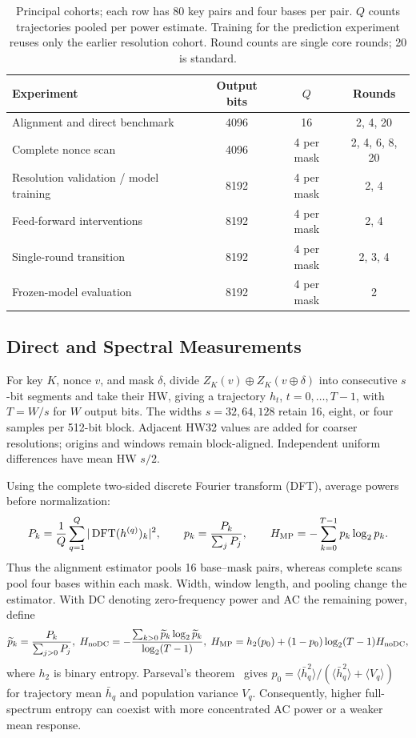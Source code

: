 \documentclass[electronics,article,submit,pdftex,oneauthor]{Definitions/mdpi}
\begin{document}
\begin{table}[t]
\caption{Principal cohorts; each row has 80 key pairs and four bases per pair. $Q$ counts trajectories pooled per power estimate. Training for the prediction experiment reuses only the earlier resolution cohort. Round counts are single core rounds; 20 is standard.\label{tab:cohorts}}
\small\setlength{\tabcolsep}{4pt}
\begin{tabularx}{\textwidth}{Xccc}
\toprule
\textbf{Experiment} & \textbf{Output bits} & \textbf{$Q$} & \textbf{Rounds}\\
\midrule
Alignment and direct benchmark & 4096 & 16 & 2, 4, 20\\
Complete nonce scan & 4096 & 4 per mask & 2, 4, 6, 8, 20\\
Resolution validation / model training & 8192 & 4 per mask & 2, 4\\
Feed-forward interventions & 8192 & 4 per mask & 2, 4\\
Single-round transition & 8192 & 4 per mask & 2, 3, 4\\
Frozen-model evaluation & 8192 & 4 per mask & 2\\
\bottomrule
\end{tabularx}
\end{table}

\subsection{Direct and Spectral Measurements}\label{sec:spectral}

For key $K$, nonce $v$, and mask $\delta$, divide $Z_K(v)\oplus Z_K(v\oplus\delta)$ into consecutive $s$-bit segments and take their HW, giving a trajectory $h_t$, $t=0,\ldots,T-1$, with $T=W/s$ for $W$ output bits. The widths $s=32,64,128$ retain 16, eight, or four samples per 512-bit block. Adjacent HW32 values are added for coarser resolutions; origins and windows remain block-aligned. Independent uniform differences have mean HW $s/2$.

Using the complete two-sided discrete Fourier transform (DFT), average powers before normalization:
\begin{equation}
 P_k=\frac1Q\sum_{q=1}^{Q}|\operatorname{DFT}(h^{(q)})_k|^2,
 \qquad p_k=\frac{P_k}{\sum_jP_j},\qquad
 H_{\rm MP}=-\sum_{k=0}^{T-1}p_k\log_2p_k .
 \label{eq:entropy}
\end{equation}
Thus the alignment estimator pools 16 base--mask pairs, whereas complete scans pool four bases within each mask. Width, window length, and pooling change the estimator. With DC denoting zero-frequency power and AC the remaining power, define
\begin{equation}
 \widetilde p_k=\frac{P_k}{\sum_{j>0}P_j},\;
 H_{\rm noDC}=-\frac{\sum_{k>0}\widetilde p_k\log_2\widetilde p_k}{\log_2(T-1)},\;
 H_{\rm MP}=h_2(p_0)+(1-p_0)\log_2(T-1)H_{\rm noDC},
 \label{eq:identity}
\end{equation}
where $h_2$ is binary entropy. Parseval's theorem~\citep{oppenheim2010} gives $p_0=\langle\bar h_q^2\rangle/(\langle\bar h_q^2\rangle+\langle V_q\rangle)$ for trajectory mean $\bar h_q$ and population variance $V_q$. Consequently, higher full-spectrum entropy can coexist with more concentrated AC power or a weaker mean response.
\end{document}
